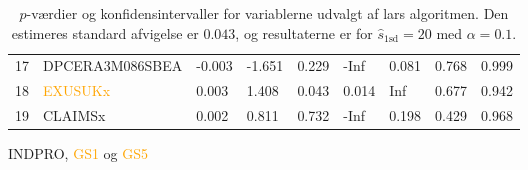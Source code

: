 \begin{table}[h]
{\begin{tabular}{lllllllll}
17 & \textcolor{red3}{DPCERA3M086SBEA} & -0.003 & -1.651  & 0.229  &    -Inf &   0.081 &  0.768 &  0.999  \\
18 & \textcolor{orange}{EXUSUKx} & 0.003 &  1.408 &  0.043  &   0.014 &     Inf &  0.677 &  0.942  \\
19 & \textcolor{blue3}{CLAIMSx} & 0.002  & 0.811  & 0.732  &    -Inf  &  0.198  & 0.429  & 0.968   \\
\bottomrule
\end{tabular}  
}
\caption{\(p\)-værdier og konfidensintervaller for variablerne udvalgt af lars algoritmen. Den estimeres standard afvigelse er \(0.043\), og resultaterne er for \(\widehat{s}_{1 \text{sd}} = 20\) med \(\alpha = 0.1\).} \label{tab:larInf}
\end{table} 
\textcolor{chartreuse4}{INDPRO}, \textcolor{orange}{GS1} og \textcolor{orange}{GS5}
